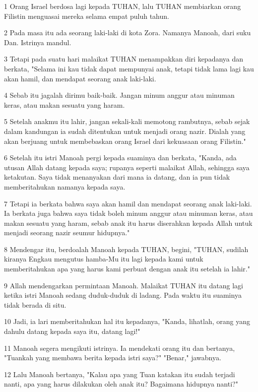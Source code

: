 \par 1 Orang Israel berdosa lagi kepada TUHAN, lalu TUHAN membiarkan orang Filistin menguasai mereka selama empat puluh tahun.
\par 2 Pada masa itu ada seorang laki-laki di kota Zora. Namanya Manoah, dari suku Dan. Istrinya mandul.
\par 3 Tetapi pada suatu hari malaikat TUHAN menampakkan diri kepadanya dan berkata, "Selama ini kau tidak dapat mempunyai anak, tetapi tidak lama lagi kau akan hamil, dan mendapat seorang anak laki-laki.
\par 4 Sebab itu jagalah dirimu baik-baik. Jangan minum anggur atau minuman keras, atau makan sesuatu yang haram.
\par 5 Setelah anakmu itu lahir, jangan sekali-kali memotong rambutnya, sebab sejak dalam kandungan ia sudah ditentukan untuk menjadi orang nazir. Dialah yang akan berjuang untuk membebaskan orang Israel dari kekuasaan orang Filistin."
\par 6 Setelah itu istri Manoah pergi kepada suaminya dan berkata, "Kanda, ada utusan Allah datang kepada saya; rupanya seperti malaikat Allah, sehingga saya ketakutan. Saya tidak menanyakan dari mana ia datang, dan ia pun tidak memberitahukan namanya kepada saya.
\par 7 Tetapi ia berkata bahwa saya akan hamil dan mendapat seorang anak laki-laki. Ia berkata juga bahwa saya tidak boleh minum anggur atau minuman keras, atau makan sesuatu yang haram, sebab anak itu harus diserahkan kepada Allah untuk menjadi seorang nazir seumur hidupnya."
\par 8 Mendengar itu, berdoalah Manoah kepada TUHAN, begini, "TUHAN, sudilah kiranya Engkau mengutus hamba-Mu itu lagi kepada kami untuk memberitahukan apa yang harus kami perbuat dengan anak itu setelah ia lahir."
\par 9 Allah mendengarkan permintaan Manoah. Malaikat TUHAN itu datang lagi ketika istri Manoah sedang duduk-duduk di ladang. Pada waktu itu suaminya tidak berada di situ.
\par 10 Jadi, ia lari memberitahukan hal itu kepadanya, "Kanda, lihatlah, orang yang dahulu datang kepada saya itu, datang lagi!"
\par 11 Manoah segera mengikuti istrinya. Ia mendekati orang itu dan bertanya, "Tuankah yang membawa berita kepada istri saya?" "Benar," jawabnya.
\par 12 Lalu Manoah bertanya, "Kalau apa yang Tuan katakan itu sudah terjadi nanti, apa yang harus dilakukan oleh anak itu? Bagaimana hidupnya nanti?"
